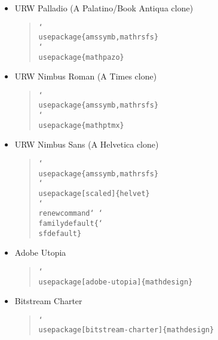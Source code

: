 \documentclass{wmu-thesis}
\begin{document}
\begin{itemize}
\item URW Palladio (A Palatino/Book Antiqua clone)
\vspace*{-5pt}%
\begin{quote}
\texttt{\char`\\ usepackage\{amssymb,mathrsfs\}}\\
\texttt{\char`\\ usepackage\{mathpazo\}}
\end{quote}
\item URW Nimbus Roman (A Times clone)
\vspace*{-5pt}%
\begin{quote}
\texttt{\char`\\ usepackage\{amssymb,mathrsfs\}}\\
\texttt{\char`\\ usepackage\{mathptmx\}}
\end{quote}
\item URW Nimbus Sans (A Helvetica clone)%
\vspace*{-5pt}%
\begin{quote}%
\texttt{\char`\\ usepackage\{amssymb,mathrsfs\}}\\%
\texttt{\char`\\ usepackage[scaled]\{helvet\}}\\%
\texttt{\char`\\ renewcommand\char`\* \char`\\familydefault\{\char`\\ sfdefault\}}%
\end{quote}
\item Adobe Utopia
\vspace*{-5pt}%
\begin{quote}
\texttt{\char`\\ usepackage[adobe-utopia]\{mathdesign\}}
\end{quote}
\item Bitstream Charter
\vspace*{-5pt}%
\begin{quote}
\texttt{\char`\\ usepackage[bitstream-charter]\{mathdesign\}}
\end{quote}
\end{itemize}
\end{document}
